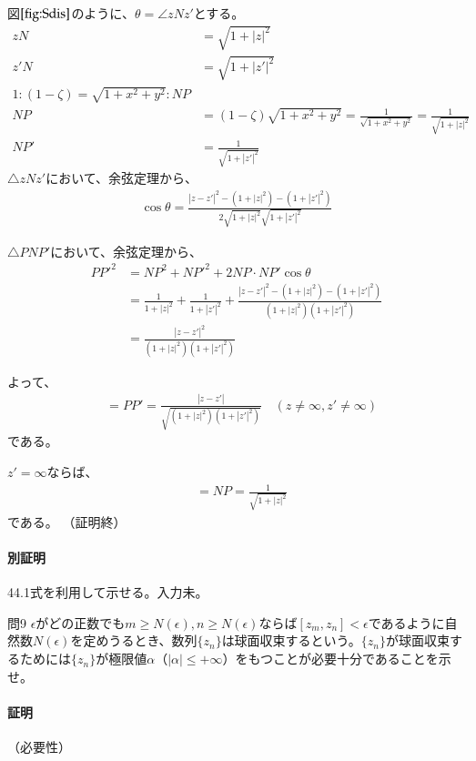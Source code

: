 図$\ref{fig:Sdis}$のように、$\theta=\angle zNz'$とする。
\begin{align*}
    zN&=\sqrt{1+|z|^2}\\
    z'N&=\sqrt{1+|z'|^2}\\
    1:(1-\zeta)=\sqrt{1+x^2+y^2}:NP\\
    NP&=(1-\zeta)\sqrt{1+x^2+y^2}=\frac{1}{\sqrt{1+x^2+y^2}}=\frac{1}{\sqrt{1+|z|^2}}\\
    NP'&=\frac{1}{\sqrt{1+|z'|^2}}
\end{align*}
$\triangle zNz'$において、余弦定理から、
\begin{align*}
    \cos\theta=\frac{|z-z'|^2-(1+|z|^2)-(1+|z'|^2)}{2\sqrt{1+|z|^2}\sqrt{1+|z'|^2}}
\end{align*}

$\triangle PNP'$において、余弦定理から、
\begin{align*}
    PP'^2
    &=NP^2+NP'^2+2NP\cdot NP'\cos\theta\\
    &=\frac{1}{1+|z|^2}+\frac{1}{1+|z'|^2}+\frac{|z-z'|^2-(1+|z|^2)-(1+|z'|^2)}{(1+|z|^2)(1+|z'|^2)}\\
    &=\frac{|z-z'|^2}{(1+|z|^2)(1+|z'|^2)}
\end{align*}

よって、
\begin{align*}
    [z,z']&=PP'=\frac{|z-z'|}{\sqrt{(1+|z|^2)(1+|z'|^2)}}
    \quad(z\neq\infty,z'\neq\infty)
\end{align*}
である。

$z'=\infty$ならば、
\begin{align*}
    [z,z']&=NP=\frac{1}{\sqrt{1+|z|^2}}
\end{align*}
である。
（証明終）

\paragraph{別証明}
44.1式を利用して示せる。入力未。

\newpage
\begin{mysimplebox}{問9}
    $\epsilon$がどの正数でも$m\ge N(\epsilon),n\ge N(\epsilon)$ならば$[z_m,z_n]<\epsilon$であるように自然数$N(\epsilon)$を定めうるとき、数列$\{z_n\}$は球面収束するという。$\{z_n\}$が球面収束するためには$\{z_n\}$が極限値$\alpha$（$|\alpha|\le+\infty$）をもつことが必要十分であることを示せ。
\end{mysimplebox}
\paragraph{証明}
（必要性）

